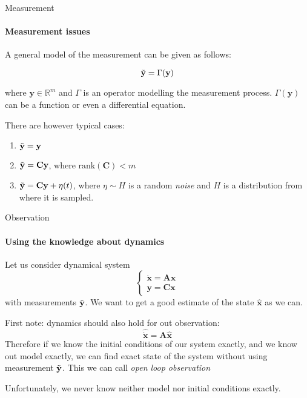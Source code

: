 \documentclass{beamer}
\begin{document}
\begin{frame}{Measurement}
\framesubtitle{Measurement issues}
\begin{flushleft}

A general model of the measurement can be given as follows:

\[
\Tilde{\mathbf y} = \Gamma(\mathbf y)
\]

where $\mathbf y \in \mathbb{R}^m$ and $\Gamma$ is an operator modelling the measurement process. $\Gamma(\mathbf y)$ can be a function or even a differential equation.

There are however typical cases:

\begin{enumerate}
\item $\Tilde{\mathbf y} = \mathbf y$
\item $\Tilde{\mathbf y} = \mathbf C \mathbf y$, where $\text{rank} (\mathbf C) < m$
\item $\Tilde{\mathbf y} = \mathbf C \mathbf y + \eta(t)$, where $\eta \sim H$ is a random \emph{noise} and $H$ is a distribution from where it is sampled.
\end{enumerate}

\end{flushleft}
\end{frame}

\begin{frame}{Observation}
\framesubtitle{Using the knowledge about dynamics}
\begin{flushleft}

Let us consider dynamical system
\[
\begin{cases}
\dot {\mathbf x} = \mathbf A \mathbf x\\
\mathbf y = \mathbf C \mathbf x
\end{cases}
\]
%
with measurements $\Tilde{\mathbf y}$. We want to get a good estimate of the state $\hat{\mathbf x}$ as we can.

\bigskip

First note: dynamics should also hold for out observation:
\[
\hat{\dot {\mathbf x}} = \mathbf A \hat{\mathbf x} 
\]
%
Therefore if we know the initial conditions of our system exactly, and we know out model exactly, we can find exact state of the system without using measurement $\Tilde{\mathbf y}$. This we can call \emph{open loop observation}

Unfortunately, we never know neither model nor initial conditions exactly.


\end{flushleft}
\end{frame}
\end{document}
